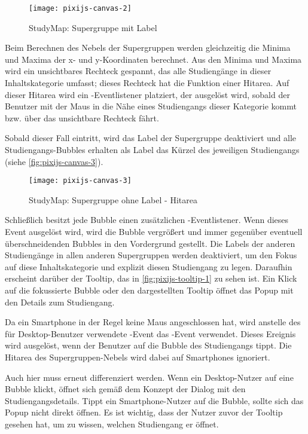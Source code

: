 \begin{figure}[H]
    \centering
    \texttt{[image: pixijs-canvas-2]}
    \caption{StudyMap: Supergruppe mit Label}
    \label{fig:pixijs-canvas-2}
\end{figure}

Beim Berechnen des Nebels der Supergruppen werden gleichzeitig die Minima und Maxima der x- und y-Koordinaten berechnet. Aus den Minima und Maxima wird ein unsichtbares Rechteck gespannt, das alle Studiengänge in dieser Inhaltskategorie umfasst; dieses Rechteck hat die Funktion einer Hitarea. Auf dieser Hitarea wird ein -Eventlistener platziert, der ausgelöst wird, sobald der Benutzer mit der Maus in die Nähe eines Studiengangs dieser Kategorie kommt bzw. über das unsichtbare Rechteck fährt.

Sobald dieser Fall eintritt, wird das Label der Supergruppe deaktiviert und alle Studiengangs-Bubbles erhalten als Label das Kürzel des jeweiligen Studiengangs (siehe \autoref{fig:pixijs-canvas-3}).

\begin{figure}[H]
    \centering
    \texttt{[image: pixijs-canvas-3]}
    \caption{StudyMap: Supergruppe ohne Label - Hitarea}
    \label{fig:pixijs-canvas-3}
\end{figure}

Schließlich besitzt jede Bubble einen zusätzlichen -Eventlistener. Wenn dieses Event ausgelöst wird, wird die Bubble vergrößert und immer gegenüber eventuell überschneidenden Bubbles in den Vordergrund gestellt. Die Labels der anderen Studiengänge in allen anderen Supergruppen werden deaktiviert, um den Fokus auf diese Inhaltskategorie und explizit diesen Studiengang zu legen. Daraufhin erscheint darüber der Tooltip, das in \autoref{fig:pixijs-tooltip-1} zu sehen ist. Ein Klick auf die fokussierte Bubble oder den dargestellten Tooltip öffnet das Popup mit den Details zum Studiengang.

Da ein Smartphone in der Regel keine Maus angeschlossen hat, wird anstelle des für Desktop-Benutzer verwendete -Event das -Event verwendet. Dieses Ereignis wird ausgelöst, wenn der Benutzer auf die Bubble des Studiengangs tippt. Die Hitarea des Supergruppen-Nebels wird dabei auf Smartphones ignoriert.

Auch hier muss erneut differenziert werden. Wenn ein Desktop-Nutzer auf eine Bubble klickt, öffnet sich gemäß dem Konzept der Dialog mit den Studiengangsdetails. Tippt ein Smartphone-Nutzer auf die Bubble, sollte sich das Popup nicht direkt öffnen. Es ist wichtig, dass der Nutzer zuvor der Tooltip gesehen hat, um zu wissen, welchen Studiengang er öffnet.

